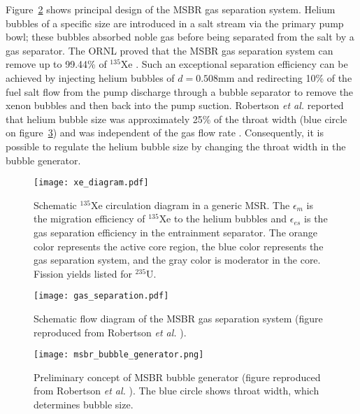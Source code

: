Figure~\ref{fig:gas_removal_system} shows principal design of the \gls{MSBR} 
gas separation system. Helium bubbles of a specific size are introduced in a 
salt stream via the primary pump bowl; these bubbles absorbed noble gas 
before being separated from the salt by a gas separator. The \gls{ORNL} proved 
that the \gls{MSBR} gas separation system can remove up to 99.44\% of 
$^{135}$Xe \cite{briggs_molten-salt_1969}. Such an exceptional separation 
efficiency can be achieved by injecting helium bubbles of $d=0.508$mm and 
redirecting 10\% of the fuel salt flow from the pump discharge through a 
bubble separator to remove the xenon bubbles and then back into the pump 
suction. Robertson \emph{et al.} reported that helium bubble size was 
approximately 25\% of the throat width (blue circle on 
figure~\ref{fig:bubble_separator}) and was independent of the gas flow rate 
\cite{robertson_conceptual_1971}. Consequently, it is possible to regulate the 
helium bubble size by changing the throat width in the bubble generator.
\begin{figure}[htp!] %
	\centering
	\texttt{[image: xe\_diagram.pdf]}
	\caption{Schematic $^{135}$Xe circulation diagram in a generic \gls{MSR}. 
	The $\epsilon_m$ is the migration efficiency of $^{135}$Xe to the helium 
	bubbles and $\epsilon_{es}$ is the gas separation efficiency in the 
	entrainment separator. The orange color represents the active core region, 
	the blue color represents the gas separation system, and the gray color is 
	moderator in the core. Fission yields listed for $^{235}$U.}
	\label{fig:xe_diagram}
\end{figure}
\begin{figure}[htp!] %
  \centering
  \texttt{[image: gas\_separation.pdf]}
  \caption{Schematic flow diagram of the \gls{MSBR} gas separation system 
  (figure reproduced from Robertson \emph{et al.} 
  \cite{robertson_conceptual_1971}).}
  \label{fig:gas_removal_system}
\end{figure}
\begin{figure}[htp!] %
  \centering
  \texttt{[image: msbr\_bubble\_generator.png]}
  \caption{Preliminary concept of \gls{MSBR} bubble generator (figure 
  reproduced from Robertson \emph{et al.} \cite{robertson_conceptual_1971}). 
  The blue circle shows throat width, which determines bubble size.}
		\vspace{-0.25in}
  \label{fig:bubble_separator}
\end{figure}
